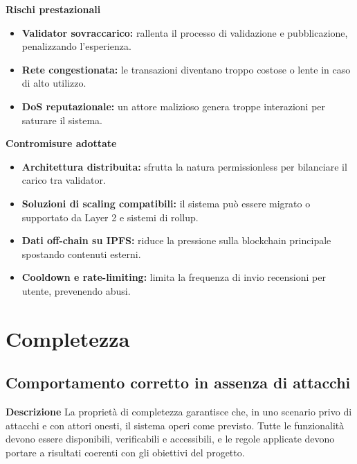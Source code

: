             \noindent \textbf{Rischi prestazionali}
                \begin{itemize}
                    \item \textbf{Validator sovraccarico:} rallenta il processo di validazione e pubblicazione, penalizzando l'esperienza.

                    \item \textbf{Rete congestionata:} le transazioni diventano troppo costose o lente in caso di alto utilizzo.

                    \item \textbf{DoS reputazionale:} un attore malizioso genera troppe interazioni per saturare il sistema.
                \end{itemize}

            \noindent \textbf{Contromisure adottate}
                \begin{itemize}
                    \item \textbf{Architettura distribuita:} sfrutta la natura permissionless per bilanciare il carico tra validator.

                    \item \textbf{Soluzioni di scaling compatibili:} il sistema può essere migrato o supportato da Layer 2 e sistemi di rollup.

                    \item \textbf{Dati off-chain su IPFS:} riduce la pressione sulla blockchain principale spostando contenuti esterni.

                    \item \textbf{Cooldown e rate-limiting:} limita la frequenza di invio recensioni per utente, prevenendo abusi.
                \end{itemize}

    \section{Completezza}
        \subsection{Comportamento corretto in assenza di attacchi}
            \noindent \textbf{Descrizione}
                La proprietà di completezza garantisce che, in uno scenario privo di attacchi e con attori onesti, il sistema operi come previsto. Tutte le funzionalità devono essere disponibili, verificabili e accessibili, e le regole applicate devono portare a risultati coerenti con gli obiettivi del progetto. \\

